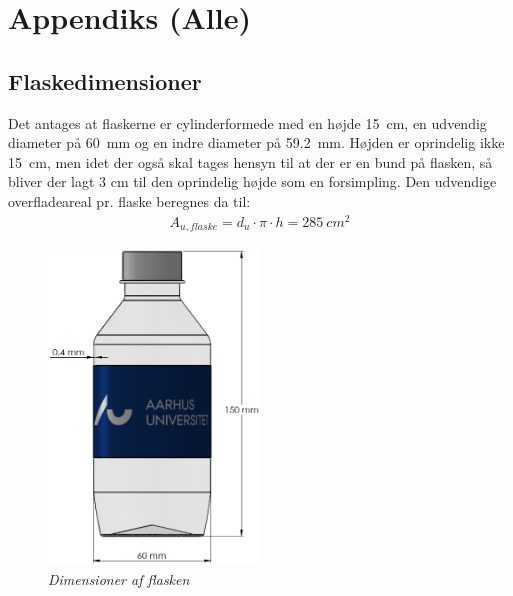 \documentclass[Hovedrapport.tex]{subfiles}
\begin{document}
%
\chapter{Appendiks (Alle)}
    \label{chap:apndx}
        \vspace{-30pt}
    \renewcommand{\thesection}{A\arabic{section}}

\section{Flaskedimensioner}
    \label{sec:apndx_flaskedim}        
Det antages at flaskerne er cylinderformede med en højde \SI{15}{cm}, en udvendig diameter på \SI{60}{mm} og en indre diameter på \SI{59,2}{mm}. Højden er oprindelig ikke \SI{15}{cm}, men idet der også skal tages hensyn til at der er en bund på flasken, så bliver der lagt 3 cm til den oprindelig højde som en forsimpling. Den udvendige overfladeareal pr. flaske beregnes da til:
\begin{align}
    A_{u,flaske}=d_u\cdot \pi \cdot h = \SI{285}{cm^2}
\end{align}        
\begin{figure}[H]
    \centering
    \includegraphics[width=0.5\textwidth]{Billeder/flaskedim.png}
    \caption{\textit{Dimensioner af flasken}}
    \label{fig:apndx_flaskedim}
\end{figure}
\newpage
\end{document}

